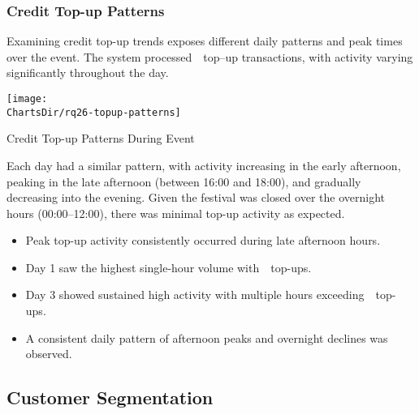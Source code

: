 
\subsubsection{Credit Top-up Patterns}
\label{subsubsec:analysis-credit-topup}


Examining credit top-up trends exposes different daily patterns and peak times over the event.
The system processed~~top–up transactions, with activity varying significantly throughout the day.

\begin{chart}[h]
	\centering
	\texttt{[image: \\ChartsDir/rq26-topup-patterns]}
	\caption{ Credit Top-up Patterns During Event}
	\label{chart:topup-patterns}
	\source
\end{chart}

Each day had a similar pattern, with activity increasing in the early afternoon, peaking in the late afternoon (between 16:00 and 18:00), and gradually decreasing into the evening.
Given the festival was closed over the overnight hours (00:00--12:00), there was minimal top-up activity as expected.

\begin{keytakeaways}
	\begin{itemize}
		\item Peak top-up activity consistently occurred during late afternoon hours.
		\item Day 1 saw the highest single-hour volume with~~top-ups.
		\item Day 3 showed sustained high activity with multiple hours exceeding~~top-ups.
		\item A consistent daily pattern of afternoon peaks and overnight declines was observed.
	\end{itemize}
\end{keytakeaways}


\subsection{Customer Segmentation}
\label{subsec:analysis-customer-segmentation}

